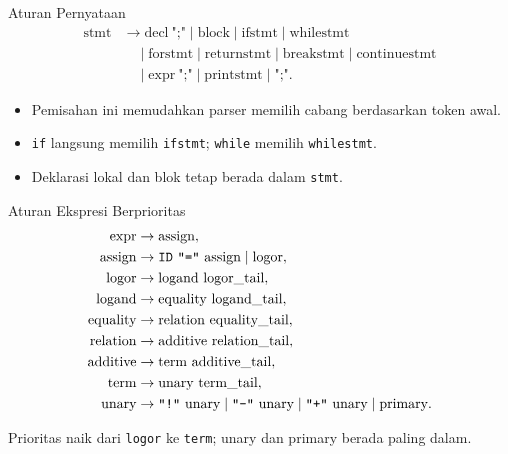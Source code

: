 \documentclass[aspectratio=169,10pt,t]{beamer}
\begin{document}
\begin{frame}{Aturan Pernyataan}
  \small
  \[
  \begin{aligned}
    \text{stmt} &\to \text{decl}\ \texttt{";"} \mid \text{block}
      \mid \text{ifstmt} \mid \text{whilestmt}\\
    &\quad \mid \text{forstmt} \mid \text{returnstmt}
      \mid \text{breakstmt} \mid \text{continuestmt}\\
    &\quad \mid \text{expr}\ \texttt{";"} \mid \text{printstmt}
      \mid \texttt{";"}.
  \end{aligned}
  \]

  \vspace{4pt}
  \begin{itemize}
    \item Pemisahan ini memudahkan parser memilih cabang berdasarkan
          token awal.
    \item \texttt{if} langsung memilih \texttt{ifstmt}; \texttt{while}
          memilih \texttt{whilestmt}.
    \item Deklarasi lokal dan blok tetap berada dalam \texttt{stmt}.
  \end{itemize}
\end{frame}

\begin{frame}{Aturan Ekspresi Berprioritas}
  \small
  \[
  \begin{aligned}
    \text{expr} &\to \text{assign},\\
    \text{assign} &\to \texttt{ID}\ \texttt{"="}\ \text{assign}
      \mid \text{logor},\\
    \text{logor} &\to \text{logand}\ \text{logor\_tail},\\
    \text{logand} &\to \text{equality}\ \text{logand\_tail},\\
    \text{equality} &\to \text{relation}\ \text{equality\_tail},\\
    \text{relation} &\to \text{additive}\ \text{relation\_tail},\\
    \text{additive} &\to \text{term}\ \text{additive\_tail},\\
    \text{term} &\to \text{unary}\ \text{term\_tail},\\
    \text{unary} &\to \texttt{"!"}\ \text{unary}
      \mid \texttt{"-"}\ \text{unary}
      \mid \texttt{"+"}\ \text{unary} \mid \text{primary}.
  \end{aligned}
  \]

  \vspace{1pt}
  {\scriptsize\color{ubbblue!75}Prioritas naik dari \texttt{logor} ke
  \texttt{term}; unary dan primary berada paling dalam.}
\end{frame}
\end{document}

